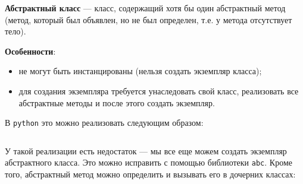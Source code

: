 \documentclass[a4paper,12pt,oneside]{extbook}
\begin{document}
\textbf{Абстрактный класс} — класс, содержащий хотя бы один абстрактный метод (метод, который был объявлен, но не был определен, т.е. у метода отсутствует тело).

\textbf{Особенности}:
\begin{itemize}
    \item не могут быть инстанцированы (нельзя создать экземпляр класса);
    \item для создания экземпляра требуется унаследовать свой класс, реализовать все абстрактные методы и после этого создать экземпляр.
\end{itemize}

В \texttt{python} это можно реализовать следующим образом:
\inputminted{python}{./examples/abstract-vanila.py}

У такой реализации есть недостаток — мы все еще можем создать экземпляр абстрактного класса. Это можно исправить с помощью библиотеки \texttt{abc}. Кроме того, абстрактный метод можно определить и вызывать его в дочерних классах:
\inputminted{python}{./examples/abstract-abc.py}
\end{document}
